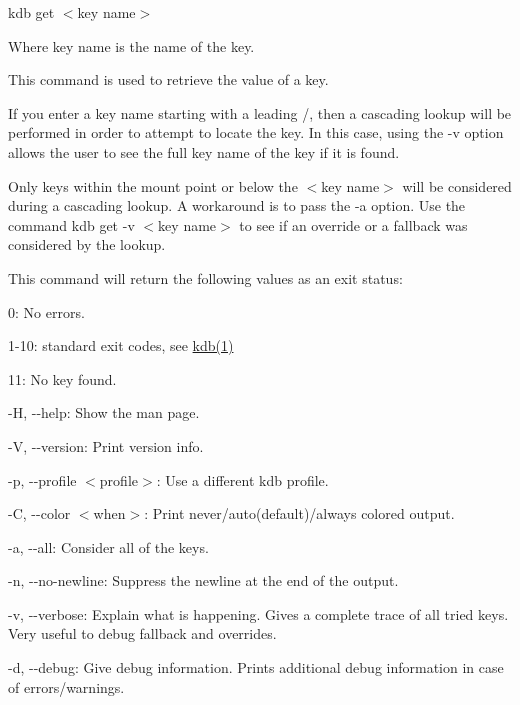 {\ttfamily kdb get $<$key name$>$}

Where {\ttfamily key name} is the name of the key.

This command is used to retrieve the value of a key.

If you enter a {\ttfamily key name} starting with a leading {\ttfamily /}, then a cascading lookup will be performed in order to attempt to locate the key. In this case, using the {\ttfamily -\/v} option allows the user to see the full key name of the key if it is found.

Only keys within the mount point or below the {\ttfamily $<$key name$>$} will be considered during a cascading lookup. A workaround is to pass the {\ttfamily -\/a} option. Use the command {\ttfamily kdb get -\/v $<$key name$>$} to see if an override or a fallback was considered by the lookup.

This command will return the following values as an exit status\+:


\begin{DoxyItemize}
\item 0\+: No errors.
\item 1-\/10\+: standard exit codes, see \mbox{\hyperlink{doc_help_kdb_md}{kdb(1)}}
\item 11\+: No key found.
\end{DoxyItemize}


\begin{DoxyItemize}
\item {\ttfamily -\/H}, {\ttfamily -\/-\/help}\+: Show the man page.
\item {\ttfamily -\/V}, {\ttfamily -\/-\/version}\+: Print version info.
\item {\ttfamily -\/p}, {\ttfamily -\/-\/profile $<$profile$>$}\+: Use a different kdb profile.
\item {\ttfamily -\/C}, {\ttfamily -\/-\/color $<$when$>$}\+: Print never/auto(default)/always colored output.
\item {\ttfamily -\/a}, {\ttfamily -\/-\/all}\+: Consider all of the keys.
\item {\ttfamily -\/n}, {\ttfamily -\/-\/no-\/newline}\+: Suppress the newline at the end of the output.
\item {\ttfamily -\/v}, {\ttfamily -\/-\/verbose}\+: Explain what is happening. Gives a complete trace of all tried keys. Very useful to debug fallback and overrides.
\item {\ttfamily -\/d}, {\ttfamily -\/-\/debug}\+: Give debug information. Prints additional debug information in case of errors/warnings.
\end{DoxyItemize}


